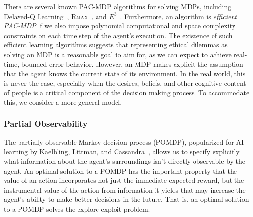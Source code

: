 \documentclass[11pt]{article}
\newcommand\jmnote[1]{\textcolor{red}{James: #1}}
\begin{document}
There are several known PAC-MDP algorithms for solving MDPs, including Delayed-Q Learning~\cite{strehl2006pac}, \textsc{Rmax}~\cite{brafman2003r}, and $E^3$~\cite{kearns2002near}. Furthermore, an algorithm is {\it efficient PAC-MDP} if we also impose polynomial computational and space complexity constraints on each time step of the agent's execution. The existence of such efficient learning algorithms suggests that representing ethical dilemmas as solving an MDP is a reasonable goal to aim for, as we can expect to achieve real-time, bounded error behavior. However, an MDP makes explicit the assumption that the agent knows the current state of its environment. In the real world, this is never the case, especially when the desires, beliefs, and other cognitive content of people is a critical component of the decision making process. To accommodate this, we consider a more general model.

\subsubsection{Partial Observability}

The partially observable Markov decision process (POMDP), popularized for AI learning by Kaelbling, Littman, and Cassandra~, allows us to specify explicitly what information about the agent's surroundings 
isn't directly observable by the agent. An optimal solution to a POMDP has the important property that the value of an action incorporates not just the immediate expected reward, but the instrumental value of the action from information it yields that may increase the agent's ability to make better decisions in the future. That is, an optimal solution to a POMDP solves the explore-exploit problem.  
\end{document}
